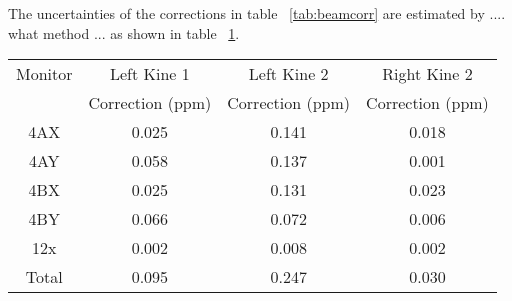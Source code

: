 The uncertainties of the corrections in table ~\ref{tab:beamcorr} are 
estimated by .... what method ... as shown in table ~\ref{tab:beamcorrerr}.

\begin{table}[!ht]
  \begin{center}
    \begin{tabular}{c|c|c|c}
      \hline\hline
      Monitor      &     Left Kine 1    &    Left Kine 2    &    Right Kine 2 \\ 
                   & Correction (ppm)   &    Correction (ppm)   &   Correction (ppm) \\ \hline
      4AX          & 0.025              &   0.141               &  0.018 \\
      4AY          & 0.058              &   0.137               &  0.001 \\
      4BX          & 0.025              &   0.131               &  0.023 \\
      4BY          & 0.066              &   0.072               &  0.006 \\
      12x          & 0.002              &   0.008               &  0.002  \\ \hline
      Total        & 0.095              &   0.247               &  0.030  \\ \hline
     \hline
    \end{tabular}
  \end{center}
\label{tab:beamcorrerr}
\end{table}
